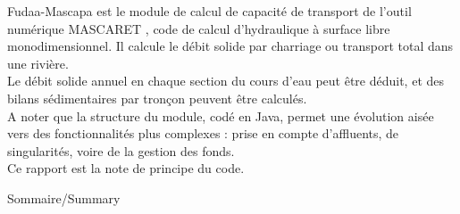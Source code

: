\documentclass[a4paper,10pt]{article}
\begin{document}

\newpage
{}

\noindent
Fudaa-Mascapa est le module de calcul de capacit\'e de transport de l'outil num\'erique MASCARET \cite{gou1}, code de calcul d'hydraulique \`a surface libre monodimensionnel. Il calcule le d\'ebit solide par charriage ou transport total dans une rivi\`ere. \\

\noindent
Le d\'ebit solide annuel en chaque section du cours d'eau peut \^etre d\'eduit, et des bilans s\'edimentaires par tron\c con peuvent \^etre calcul\'es. \\

\noindent
A noter que la structure du module, cod\'e en Java, permet une \'evolution ais\'ee vers des fonctionnalit\'es plus complexes : prise en compte d'affluents, de singularit\'es, voire de la gestion des fonds. \\

\noindent
Ce rapport est la note de principe du code.


\newpage
\begin{center} Sommaire/Summary
\end{center}\
\tableofcontents

\end{document}
